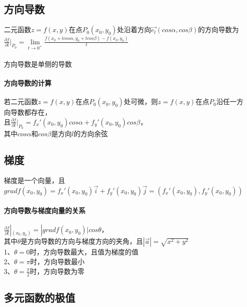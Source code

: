 \documentclass{article}
\begin{document}
\begin{flushleft}
	\subsection{方向导数}
	二元函数$z=f(x,y)$在点$P_0(x_0,y_0)$处沿着方向$\vec{e_l}(cos\alpha,cos\beta)$的方向导数为
	$\frac{\partial f}{\partial l}|_{P_0}=\lim\limits_{t\to 0^+}\frac{f(x_0+tcos\alpha,y_0+tcos\beta)-f(x_0,y_0)}{t}$\\
	~\\
	方向导数是单侧的导数\\
	
	\paragraph{方向导数的计算}
	若二元函数$z=f(x,y)$在点$P_0(x_0,y_0)$处可微，则$z=f(x,y)$在点$P_0$沿任一方向导数都存在，\\
	且$\frac{\partial f}{\partial l}|_{P_0}=f_x'(x_0,y_0)cos\alpha+f_y'(x_0,y_0)cos\beta$，\\
	其中$cos\alpha$和$cos\beta$是方向$l$的方向余弦\\
	
	\subsection{梯度}
	梯度是一个向量，且$gradf(x_0,y_0)=f_x'(x_0,y_0)\vec{i}+f_y'(x_0,y_0)\vec{j}=(f_x'(x_0,y_0),f_y'(x_0,y_0))$\\
	
	\paragraph{方向导数与梯度向量的关系}
	$\frac{\partial f}{\partial l}|_{(x_0,y_0)}=|gradf(x_0,y_0)|cos\theta$，\\
	其中$\theta$是方向导数的方向与梯度方向的夹角，且$|\vec{a}|=\sqrt{x^2+y^2}$\\
	1、$\theta=0$时，方向导数最大，且值为梯度的值\\
	2、$\theta=\pi$时，方向导数最小\\
	3、$\theta=\frac{\pi}{2}$时，方向导数为零\\
	
	\subsection{多元函数的极值}
	
	
	
	
\end{flushleft}
\end{document}
